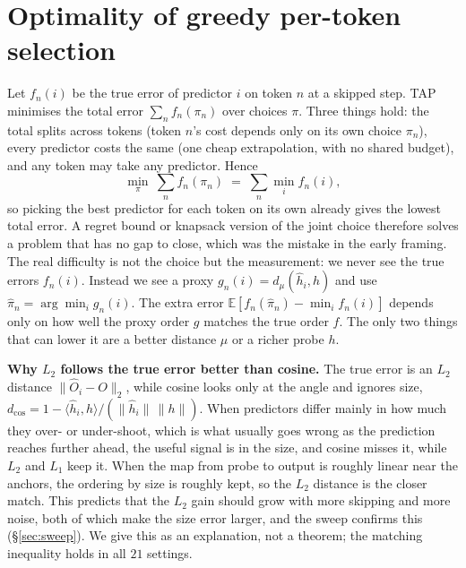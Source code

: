 \documentclass[10pt,twocolumn]{article}
\begin{document}
\section{Optimality of greedy per-token selection}\label{sec:theory}
Let $f_n(i)$ be the true error of predictor $i$ on token $n$ at a skipped step. TAP
minimises the total error $\sum_n f_n(\pi_n)$ over choices $\pi$. Three things hold: the
total splits across tokens (token $n$'s cost depends only on its own choice $\pi_n$), every
predictor costs the same (one cheap extrapolation, with no shared budget), and any token may
take any predictor. Hence
\begin{equation}
\min_{\pi}\ \sum_{n} f_n(\pi_n)\;=\;\sum_n \min_i f_n(i),
\end{equation}
so picking the best predictor for each token on its own already gives the lowest total
error. A regret bound or knapsack version of the joint choice therefore solves a problem
that has no gap to close, which was the mistake in the early framing. The real difficulty is
not the choice but the measurement: we never see the true errors $f_n(i)$. Instead we see a
proxy $g_n(i)=d_\mu(\hat h_i,h)$ and use $\hat\pi_n=\arg\min_i g_n(i)$. The extra error
$\mathbb E[f_n(\hat\pi_n)-\min_i f_n(i)]$ depends only on how well the proxy order $g$
matches the true order $f$. The only two things that can lower it are a better distance
$\mu$ or a richer probe $h$.

\textbf{Why $L_2$ follows the true error better than cosine.} The true error is an $L_2$
distance $\|\hat O_i-O\|_2$, while cosine looks only at the angle and ignores size,
$d_{\cos}=1-\langle\hat h_i,h\rangle/(\|\hat h_i\|\,\|h\|)$. When predictors differ mainly in
how much they over- or under-shoot, which is what usually goes wrong as the prediction
reaches further ahead, the useful signal is in the size, and cosine misses it, while $L_2$
and $L_1$ keep it. When the map from probe to output is roughly linear near the anchors, the
ordering by size is roughly kept, so the $L_2$ distance is the closer match. This predicts
that the $L_2$ gain should grow with more skipping and more noise, both of which make the
size error larger, and the sweep confirms this (\S\ref{sec:sweep}). We give this as an
explanation, not a theorem; the matching inequality holds in all $21$ settings.
\end{document}
